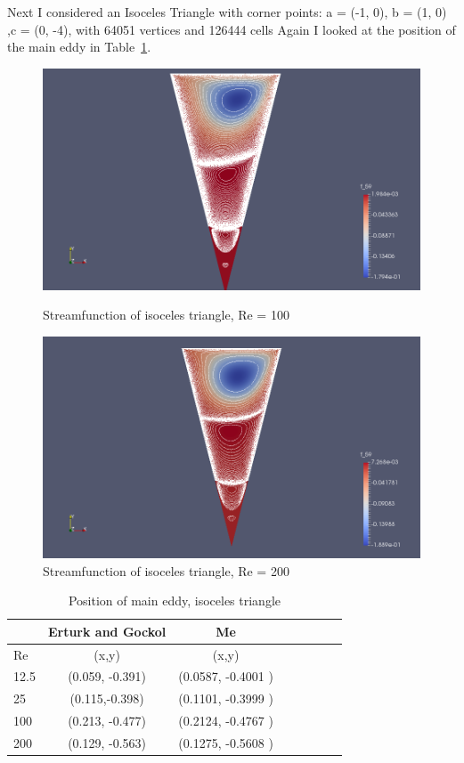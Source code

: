 \documentclass[a4paper,norsk]{article}
\begin{document}
Next I considered an Isoceles Triangle with corner points: \newline
a = (-1, 0), b = (1, 0) ,c = (0, -4), with 64051 vertices and 126444 cells\newline
Again I looked at the position of the main eddy in Table~\ref{table:isoceles_triangle}.
\newline
\begin{figure}
    \centering
    \includegraphics[trim = 100mm 0mm 100mm 0mm, clip, scale=0.4]{isoceles_Re_100.png}
    \caption{Streamfunction of isoceles triangle, Re = 100}
     \includegraphics[trim = 100mm 0mm 100mm 0mm, clip, scale=0.4]{isoceles_Re_200.png}
     \caption{Streamfunction of isoceles triangle, Re = 200}
    \label{fig:awesome_image}
\end{figure}


\begin{table}
  \centering%
  \begin{tabular}{l*{6}{c}r}
   & Erturk and Gockol & Me\\
   \hline 
   Re &(x,y) & (x,y)  \\
   12.5 & (0.059, -0.391) & (0.0587, -0.4001 )\\ 
   25 & (0.115,-0.398) &  (0.1101, -0.3999 )\\
   100 & (0.213, -0.477)& (0.2124, -0.4767 ) \\
   200 & (0.129, -0.563)& (0.1275, -0.5608 )\\  
   \hline
  \end{tabular}
  \caption{Position of main eddy, isoceles triangle}\label{table:isoceles_triangle}
\end{table}
\end{document}
